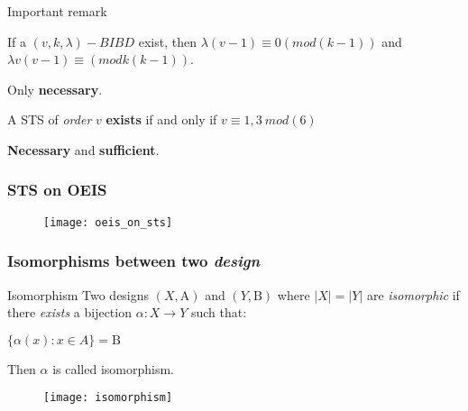 \begin{frame}[plain,c]
\begin{center}
	\huge Important remark
\end{center}
\end{frame}

\begin{frame}
	\pause[1]
	\begin{theorem}
		If a $(v,k,\lambda)-BIBD$ exist, then $\lambda(v-1) \equiv 0 (mod(k-1))$ and $\lambda v(v-1) \equiv (mod k(k-1))$.
	\end{theorem}
	
	\pause[2]
	Only \textbf{necessary}.
	
	\pause[1]
	\begin{theorem}
		A STS of \textit{order} $v$ \textbf{exists} if and only if $v\equiv 1,3\ mod(6)$  
	\end{theorem}
	
	\pause[2]
	\textbf{Necessary} and \textbf{sufficient}.
\end{frame}
\begin{frame}
\frametitle{STS on OEIS}
\begin{figure}
	\texttt{[image: oeis\_on\_sts]}
\end{figure}
\end{frame}

\begin{frame}
\frametitle{Isomorphisms between two \textit{design}}
\begin{block}{Isomorphism}
Two designs $(X,\mathrm{A})$ and $(Y,\mathrm{B})$ where $|X|=|Y|$ are \textit{isomorphic} if there \textit{exists} a bijection $\alpha : X \rightarrow Y$ such that:
\begin{center}
	\begin{math}
	\{ \alpha(x) : x \in A \} = \mathrm{B}
	\end{math}%

\end{center}	
Then $\alpha$ is called isomorphism.
\end{block}
\begin{figure}
	\texttt{[image: isomorphism]}
\end{figure}
\end{frame}

